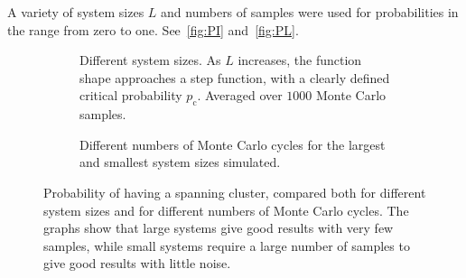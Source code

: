 \documentclass[11pt,british,a4paper]{report}
\begin{document}
A variety of system sizes \(L\) and numbers of samples were used for probabilities in the range from zero to one. See~\vref{fig:PI} and~\vref{fig:PL}.
\begin{figure}[bth]
    \centering
    \begin{subfigure}{\textwidth}
        \centering
        \caption{Different system sizes. As \(L\) increases, the function shape approaches a step function, with a clearly defined critical probability \(p_\mathrm{c}\). Averaged over \(\num{1000}\) Monte Carlo samples.}%
    \end{subfigure}
    \begin{subfigure}{\textwidth}
        \centering
        \caption{Different numbers of Monte Carlo cycles for the largest and smallest system sizes simulated.}%
    \end{subfigure}
    \caption{Probability of having a spanning cluster, compared both for different system sizes and for different numbers of Monte Carlo cycles. The graphs show that large systems give good results with very few samples, while small systems require a large number of samples to give good results with little noise.}
    \label{fig:PI}
\end{figure}
\end{document}
